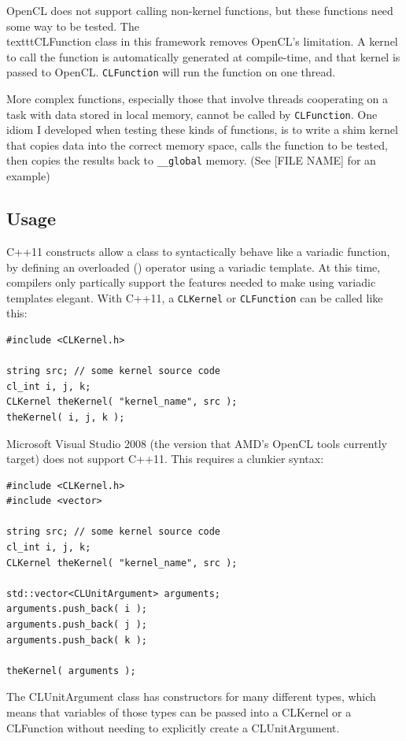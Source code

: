 \documentclass{article}
\begin{document}
OpenCL does not support calling non-kernel functions, but these functions need some way to be tested. The \\texttt{CLFunction} class in this framework removes OpenCL's limitation. A kernel to call the function is automatically generated at compile-time, and that kernel is passed to OpenCL. \texttt{CLFunction} will run the function on one thread.

More complex functions, especially those that involve threads cooperating on a task with data stored in local memory, cannot be called by \texttt{CLFunction}. One idiom I developed when testing these kinds of functions, is to write a shim kernel that copies data into the correct memory space, calls the function to be tested, then copies the results back to \texttt{\_\_global} memory. (See [FILE NAME] for an example)

\subsection{Usage}
C++11 constructs allow a class to syntactically behave like a variadic function, by defining an overloaded () operator using a variadic template. At this time, compilers only partically support the features needed to make using variadic templates elegant. With C++11, a \texttt{CLKernel} or \texttt{CLFunction} can be called like this:

\begin{lstlisting}
#include <CLKernel.h>

string src; // some kernel source code
cl_int i, j, k;
CLKernel theKernel( "kernel_name", src );
theKernel( i, j, k );
\end{lstlisting}

Microsoft Visual Studio 2008 (the version that AMD's OpenCL tools currently target) does not support C++11. This requires a clunkier syntax:

\begin{lstlisting}
#include <CLKernel.h>
#include <vector>

string src; // some kernel source code
cl_int i, j, k;
CLKernel theKernel( "kernel_name", src );

std::vector<CLUnitArgument> arguments;
arguments.push_back( i ); 
arguments.push_back( j ); 
arguments.push_back( k ); 

theKernel( arguments );
\end{lstlisting}

The CLUnitArgument class has constructors for many different types, which means that variables of those types can be passed into a CLKernel or a CLFunction without needing to explicitly create a CLUnitArgument.
\end{document}
